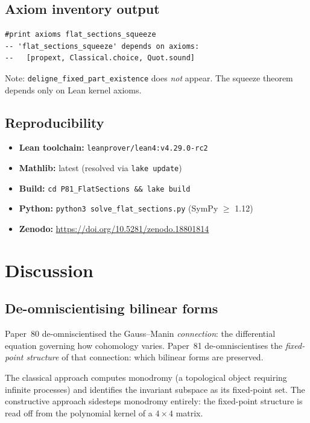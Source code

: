 \documentclass[11pt]{article}
\theoremstyle{plain}
\theoremstyle{definition}
\theoremstyle{remark}
\newcommand{\leanRepo}{\url{https://doi.org/10.5281/zenodo.18801814}}
\begin{document}
\subsection{Axiom inventory output}

\begin{lstlisting}
#print axioms flat_sections_squeeze
-- 'flat_sections_squeeze' depends on axioms:
--   [propext, Classical.choice, Quot.sound]
\end{lstlisting}

Note: \texttt{deligne\_fixed\_part\_existence} does \emph{not}
appear.  The squeeze theorem depends only on Lean kernel axioms.

\subsection{Reproducibility}

\begin{itemize}[nosep]
\item \textbf{Lean toolchain:} \texttt{leanprover/lean4:v4.29.0-rc2}
\item \textbf{Mathlib:} latest (resolved via \texttt{lake update})
\item \textbf{Build:} \texttt{cd P81\_FlatSections \&\& lake build}
\item \textbf{Python:} \texttt{python3 solve\_flat\_sections.py}
      (SymPy $\geq$ 1.12)
\item \textbf{Zenodo:} \leanRepo
\end{itemize}

\section{Discussion}\label{sec:discussion}

\subsection{De-omniscientising bilinear forms}

Paper~80 de-omniscientised the Gauss--Manin \emph{connection}:
the differential equation governing how cohomology varies.
Paper~81 de-omniscientises the \emph{fixed-point structure}
of that connection: which bilinear forms are preserved.

The classical approach computes monodromy (a topological
object requiring infinite processes) and identifies the
invariant subspace as its fixed-point set.  The constructive
approach sidesteps monodromy entirely: the fixed-point
structure is read off from the polynomial kernel of a
$4 \times 4$ matrix.
\end{document}
